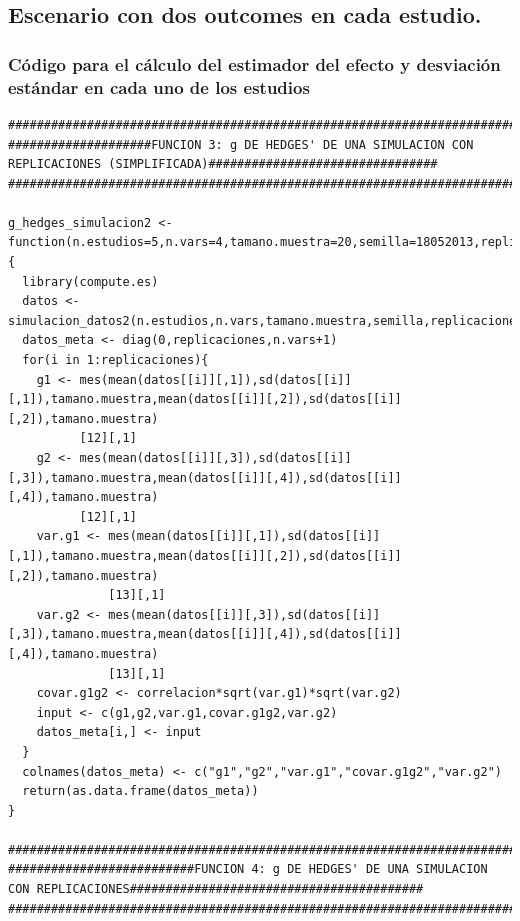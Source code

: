 \documentclass[a4paper,openright,12pt]{report}
\begin{document}
\subsection{Escenario con dos outcomes en cada estudio.}

\subsubsection{Código para el cálculo del estimador del efecto y desviación estándar en cada uno de los estudios}
{\tiny
\begin{verbatim}
##############################################################################################################################
####################FUNCION 3: g DE HEDGES' DE UNA SIMULACION CON REPLICACIONES (SIMPLIFICADA)################################
##############################################################################################################################

g_hedges_simulacion2 <- function(n.estudios=5,n.vars=4,tamano.muestra=20,semilla=18052013,replicaciones=5,correlacion=0){
  library(compute.es)
  datos <- simulacion_datos2(n.estudios,n.vars,tamano.muestra,semilla,replicaciones) 
  datos_meta <- diag(0,replicaciones,n.vars+1)
  for(i in 1:replicaciones){
    g1 <- mes(mean(datos[[i]][,1]),sd(datos[[i]][,1]),tamano.muestra,mean(datos[[i]][,2]),sd(datos[[i]][,2]),tamano.muestra)
          [12][,1]
    g2 <- mes(mean(datos[[i]][,3]),sd(datos[[i]][,3]),tamano.muestra,mean(datos[[i]][,4]),sd(datos[[i]][,4]),tamano.muestra)
          [12][,1]
    var.g1 <- mes(mean(datos[[i]][,1]),sd(datos[[i]][,1]),tamano.muestra,mean(datos[[i]][,2]),sd(datos[[i]][,2]),tamano.muestra)
              [13][,1]
    var.g2 <- mes(mean(datos[[i]][,3]),sd(datos[[i]][,3]),tamano.muestra,mean(datos[[i]][,4]),sd(datos[[i]][,4]),tamano.muestra)
              [13][,1]
    covar.g1g2 <- correlacion*sqrt(var.g1)*sqrt(var.g2)
    input <- c(g1,g2,var.g1,covar.g1g2,var.g2)
    datos_meta[i,] <- input
  }
  colnames(datos_meta) <- c("g1","g2","var.g1","covar.g1g2","var.g2")
  return(as.data.frame(datos_meta))
}

##############################################################################################################################
##########################FUNCION 4: g DE HEDGES' DE UNA SIMULACION CON REPLICACIONES#########################################
##############################################################################################################################


\end{verbatim}}
\end{document}
